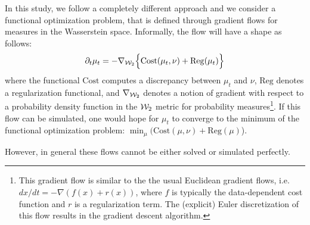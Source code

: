In this study, we follow a completely different approach and we consider a functional optimization problem, that is defined through gradient flows for measures in the Wasserstein space. Informally, the flow will have a shape as follows:
\begin{align}
\partial_t \mu_t = - \nabla_{{\cal W}_2} \Bigl\{ \mathrm{Cost}(\mu_t, \nu) + \mathrm{Reg}(\mu_t)\Bigr\} \label{eqn:gradflow}
\end{align}
where the functional $\mathrm{Cost}$ computes a discrepancy between $\mu_t$ and $\nu$, $\mathrm{Reg}$ denotes a regularization functional, and $\nabla_{{\cal W}_2}$ denotes a notion of gradient with respect to a probability density function in the ${\cal W}_2$ metric for probability measures\footnote{This gradient flow is similar to the the usual Euclidean gradient flows, i.e.\ $dx/dt = - \nabla (f(x) + r(x))$, where $f$ is typically the data-dependent cost function and $r$ is a regularization term. The (explicit) Euler discretization of this flow results in the gradient descent algorithm.}. If this flow can be simulated, one would hope for $\mu_t$ to converge to the minimum of the functional optimization problem: $\min_\mu ( \mathrm{Cost}(\mu, \nu) + \mathrm{Reg}(\mu)$).

However, in general these flows cannot be either solved or simulated perfectly. 
